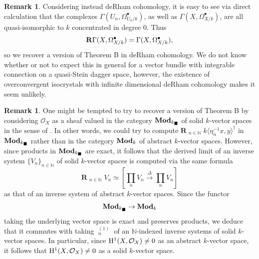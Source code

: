 \documentclass[11pt,leqno,a4paper]{amsart}
\theoremstyle{remark}
\theoremstyle{definition}
\newtheorem{remark}[theorem]{Remark}
\numberwithin{equation}{theorem}
\def\N{{\mathbb N}}
\def\cO{{\mathcal O}}
\def\limpro{\mathop{\lim\limits_{\displaystyle\leftarrow}}}
\newcommand{\weak}[1]{\langle #1\rangle^\dagger}
\begin{document}
\begin{remark} Considering instead de\thinspace Rham cohomology, it is easy to see via direct calculation that the complexes $\Gamma(U_n,\Omega^\bullet_{U_n/k})$, as well as $\Gamma(X,\Omega^\bullet_{X/k})$, are all quasi-isomorphic to $k$ concentrated in degree $0$. Thus
\[ {\bf R}\Gamma(X,\Omega^\bullet_{X/k}) =  \Gamma(X,\Omega^\bullet_{X/k}),  \]
so we recover a version of Theorem B in de\thinspace Rham cohomology. We do not know whether or not to expect this in general for a vector bundle with integrable connection on a quasi-Stein dagger space, however, the existence of overconvergent isocrystals with infinite dimensional de\thinspace Rham cohomology \cite[\S4.2]{LS07} makes it seem unlikely.  
\end{remark}

\begin{remark}
One might be tempted to try to recover a version of Theorem B by considering $\cO_X$ as a sheaf valued in the category ${\bf Mod}_{k_{\blacksquare}}$ of solid $k$-vector spaces in the sense of \cite{CS19}. In other words, we could try to compute $\mathbf{R}\!\limpro_{n\in \N} k\weak{\eta_n^{-1}x,y}$ in ${\bf Mod}_{k_{\blacksquare}}$ rather than in the category ${\bf Mod}_k$ of abstract $k$-vector spaces. However, since products in ${\bf Mod}_{k_{\blacksquare}}$ are exact, it follows that the derived limit of an inverse system $\{V_n\}_{n\in \N}$ of solid $k$-vector spaces is computed via the same formula
\[ \mathbf{R}\!\limpro_{n\in \N} V_n\simeq \left[ \prod_n V_n\overset{\Delta}{\longrightarrow} \prod_n V_n \right] \]
as that of an inverse system of abstract $k$-vector spaces. Since the functor  
\[ {\bf Mod}_{k_{\blacksquare}} \to {\bf Mod}_k \]
taking the underlying vector space is exact and preserves products, we deduce that it commutes with taking $\limpro_{n}^{(1)}$ of an $\N$-indexed inverse systems of solid $k$-vector spaces. In particular, since ${\rm H}^1(X,\cO_X)\neq 0$ as an abstract $k$-vector space, it follows that ${\rm H}^1(X,\cO_X)\neq 0$ as a solid $k$-vector space. 
\end{remark}
\end{document}
